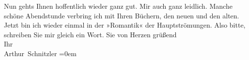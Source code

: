 \begin{ledgroupsized}[t]{13cm}
                    Nun gehts Ihnen hoffentlich wieder ganz gut. Mir auch ganz leidlich. Manche  schöne Abendstunde verbring ich mit Ihren
                    Büchern, den neuen und den alten. Jetzt bin ich wieder einmal in der »Romantik«
                    der Hauptströmungen.\pend
           \pstart
           Also bitte, schreiben Sie mir gleich ein Wort.\pend
           \pstart
           Sie von Herzen grüßend{\\[\baselineskip]}Ihr{\\[\baselineskip]}\spacefill\mbox{Arthur Schnitzler}\pend
           \leftskip=0em{}
         
         \endnumbering{}\end{ledgroupsized}  \newcommand{\dateiname}{L02432}\newcommand{\titel}{Arthur Schnitzler an Georg Brandes, 11. 2. 1925}\newcommand{\editorInnen}{Martin Anton Müller und Gerd-Hermann Susen}
      